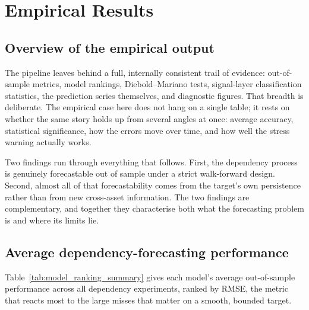\section{Empirical Results}

\subsection{Overview of the empirical output}
\label{sec:results_overview}

The pipeline leaves behind a full, internally consistent trail of evidence: out-of-sample metrics, model rankings, Diebold--Mariano tests, signal-layer classification statistics, the prediction series themselves, and diagnostic figures. That breadth is deliberate. The empirical case here does not hang on a single table; it rests on whether the same story holds up from several angles at once: average accuracy, statistical significance, how the errors move over time, and how well the stress warning actually works.

Two findings run through everything that follows. First, the dependency process is genuinely forecastable out of sample under a strict walk-forward design. Second, almost all of that forecastability comes from the target's own persistence rather than from new cross-asset information. The two findings are complementary, and together they characterise both what the forecasting problem is and where its limits lie.

\subsection{Average dependency-forecasting performance}

Table~\ref{tab:model_ranking_summary} gives each model's average out-of-sample performance across all dependency experiments, ranked by RMSE, the metric that reacts most to the large misses that matter on a smooth, bounded target.

